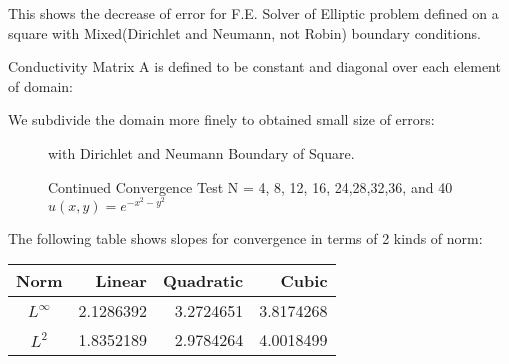 \documentclass[11pt, notitlepage,  letterpaper]{article}
\begin{document}
\newpage

This shows the decrease of error for F.E. Solver of Elliptic problem defined on a square with Mixed(Dirichlet and Neumann, not Robin) boundary conditions. 

Conductivity Matrix A is defined to be constant and diagonal over each element of domain:

We subdivide the domain more finely to obtained small size of errors:

\begin{figure}[h]
    \begin{center}
    \caption{\label{scrvsol2}Continued Convergence Test N = 4, 8, 12, 16, 24,28,32,36, and 40 $u(x,y) = e^{- x^2 - y^2}$} with Dirichlet and Neumann Boundary of Square.
    \end{center}
\end{figure}

The following table shows slopes for convergence in terms of 2 kinds of norm:
\begin{center}
\begin{tabular}{|c||r|r|r|}  \hline
Norm  & Linear & Quadratic & Cubic\\ \hline \hline
$L^{\infty}$&2.1286392&3.2724651&3.8174268 \\\hline
$L^2$&1.8352189&2.9784264&4.0018499\\\hline
\end{tabular}
\end{center}
\end{document}
